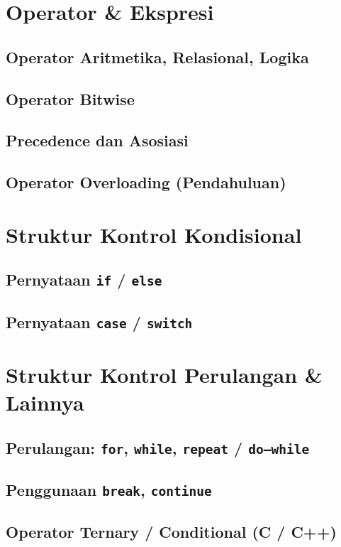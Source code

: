 \documentclass[12pt,a4paper]{book}
\begin{document}
\chapter{Operator \& Ekspresi}
\section{Operator Aritmetika, Relasional, Logika}
\section{Operator Bitwise}
\section{Precedence dan Asosiasi}
\section{Operator Overloading (Pendahuluan)}

\chapter{Struktur Kontrol Kondisional}
\section{Pernyataan \texttt{if} / \texttt{else}}
\section{Pernyataan \texttt{case} / \texttt{switch}}

\chapter{Struktur Kontrol Perulangan & Lainnya}
\section{Perulangan: \texttt{for}, \texttt{while}, \texttt{repeat} / \texttt{do–while}}
\section{Penggunaan \texttt{break}, \texttt{continue}}
\section{Operator Ternary / Conditional (C / C++)}
\end{document}
